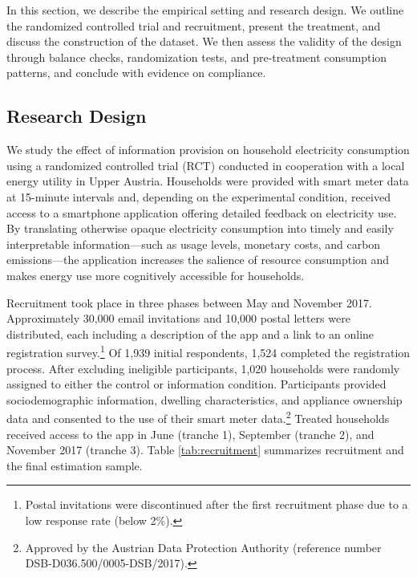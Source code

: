 In this section, we describe the empirical setting and research design. We outline the randomized controlled trial and recruitment, present the treatment, and discuss the construction of the dataset. We then assess the validity of the design through balance checks, randomization tests, and pre-treatment consumption patterns, and conclude with evidence on compliance.
\subsection{Research Design}

We study the effect of information provision on household electricity consumption using a randomized controlled trial (RCT) conducted in cooperation with a local energy utility in Upper Austria. Households were provided with smart meter data at 15-minute intervals and, depending on the experimental condition, received access to a smartphone application offering detailed feedback on electricity use. By translating otherwise opaque electricity consumption into timely and easily interpretable information—such as usage levels, monetary costs, and carbon emissions—the application increases the salience of resource consumption and makes energy use more cognitively accessible for households.

Recruitment took place in three phases between May and November 2017. Approximately 30,000 email invitations and 10,000 postal letters were distributed, each including a description of the app and a link to an online registration survey.\footnote{Postal invitations were discontinued after the first recruitment phase due to a low response rate (below 2\%).} Of 1,939 initial respondents, 1,524 completed the registration process. After excluding ineligible participants, 1,020 households were randomly assigned to either the control or information condition. Participants provided sociodemographic information, dwelling characteristics, and appliance ownership data and consented to the use of their smart meter data.\footnote{Approved by the Austrian Data Protection Authority (reference number DSB-D036.500/0005-DSB/2017).} Treated households received access to the app in June (tranche 1), September (tranche 2), and November 2017 (tranche 3). Table \ref{tab:recruitment} summarizes recruitment and the final estimation sample.

